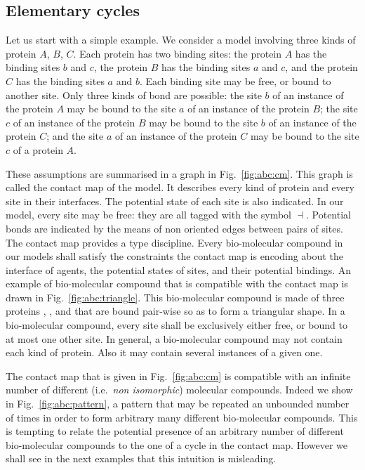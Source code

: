 \documentclass{entcs}
\newcommand{\freesymbol}{\dashv}
\begin{document}
\subsection{Elementary cycles}

\label{sec:triangle}

Let us start with a simple example. We consider a model involving three kinds of protein $A$, $B$, $C$. Each protein has two binding sites: the protein $A$ has the binding sites $b$ and $c$, the protein $B$ has the binding sites $a$ and $c$, and the protein $C$ has the binding sites $a$ and $b$. Each binding site may be free, or bound to another site. Only three kinds of bond are possible: the site $b$ of an instance of the protein $A$ may be bound to the site $a$ of an instance of the protein $B$; the site $c$ of an instance of the  protein $B$ may be bound to the site $b$ of an instance of the protein $C$; and the site $a$ of an instance of the protein $C$ may be bound to the site $c$ of a protein $A$.

These assumptions are summarised in a graph in Fig.~\ref{fig:abc:cm}. This graph is called the contact map of the model. It describes every kind of protein and every site in their interfaces. The potential state of each site is also indicated. In our model, every site may be free: they are all tagged with the symbol $\freesymbol$. Potential bonds are indicated by the means of non oriented edges between pairs of sites.  The contact map provides a type discipline.
Every bio-molecular compound in our models shall satisfy the constraints the contact map is encoding about the interface of agents, the potential states of sites, and their potential bindings. An example of bio-molecular compound that is compatible with the contact map is drawn in Fig.~\ref{fig:abc:triangle}. This bio-molecular compound is made of three proteins , , and  that are bound pair-wise so as to form a triangular shape.
In a bio-molecular compound, every site shall be exclusively either free, or bound to at most one other site. In general, a bio-molecular compound may not contain each kind of protein. Also it may contain several instances of a given one.

The contact map that is given in Fig.~\ref{fig:abc:cm} is compatible with an infinite number of different (i.e.~\emph{non isomorphic}) molecular compounds.
Indeed we show in Fig.~\ref{fig:abc:pattern}, a pattern
that may be repeated an unbounded number of times in order to form arbitrary many different bio-molecular compounds. This is tempting to relate the potential presence of an arbitrary number of different bio-molecular compounds to the one of a cycle in the contact map. However we shall see in the next examples that this intuition is misleading.
\end{document}
